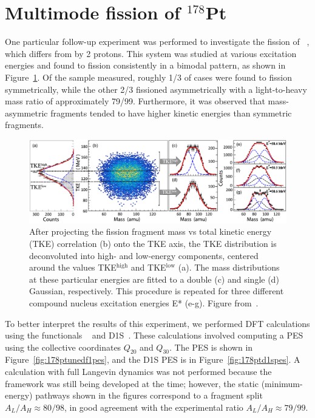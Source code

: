 \section{Multimode fission of $^{178}$Pt}\label{sect:178Ptfrags}

One particular follow-up experiment was performed to investigate the fission of {\Pt}~\cite{Tsekhanovich2019}, which differs from {\Hg} by 2 protons. This system was studied at various excitation energies and found to fission consistently in a bimodal pattern, as shown in Figure~\ref{fig:178ptexptdata}. Of the sample measured, roughly 1/3 of cases were found to fission symmetrically, while the other 2/3 fissioned asymmetrically with a light-to-heavy mass ratio of approximately 79/99. Furthermore, it was observed that mass-asymmetric fragments tended to have higher kinetic energies than symmetric fragments.

\begin{figure}
	\centering
	\includegraphics[width=0.95\linewidth]{TeX_files/178Pt_expt_data}
	\caption[After projecting the fission fragment mass vs total kinetic energy (TKE) correlation (b) onto the TKE axis, the TKE distribution is deconvoluted into high- and low-energy components, centered around the values TKE$^\mathrm{high}$ and TKE$^\mathrm{low}$ (a). The mass distributions at these particular energies are fitted to a double (c) and single (d) Gaussian, respectively. This procedure is repeated for three different compound nucleus excitation energies E* (e-g).]{After projecting the fission fragment mass vs total kinetic energy (TKE) correlation (b) onto the TKE axis, the TKE distribution is deconvoluted into high- and low-energy components, centered around the values TKE$^\mathrm{high}$ and TKE$^\mathrm{low}$ (a). The mass distributions at these particular energies are fitted to a double (c) and single (d) Gaussian, respectively. This procedure is repeated for three different compound nucleus excitation energies E* (e-g). Figure from~\cite{Tsekhanovich2019}.}
	\label{fig:178ptexptdata}
\end{figure}

To better interpret the results of this experiment, we performed DFT calculations using the functionals {\hfb}~\cite{Schunck2015} and D1S~\cite{Berger1989}. These calculations involved computing a PES using the collective coordinates $Q_{20}$ and $Q_{30}$. The {\hfb} PES is shown in Figure~\ref{fig:178ptunedf1pes}, and the D1S PES is in Figure~\ref{fig:178ptd1spes}. A calculation with full Langevin dynamics was not performed because the framework was still being developed at the time; however, the static (minimum-energy) pathways shown in the figures correspond to a fragment split $A_L/A_H \approx 80/98$, in good agreement with the experimental ratio $A_L/A_H \approx 79/99$.

